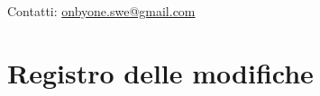\documentclass[11pt, a4paper]{article}
\begin{document}
\begin{titlepage}
    \vspace{0.5cm}
    
    {\large Contatti: \href{mailto:onbyone.swe@gmail.com}{onbyone.swe@gmail.com} }
    
\end{titlepage}

\newpage


\section*{Registro delle modifiche}

\vspace{1cm}
\end{document}
